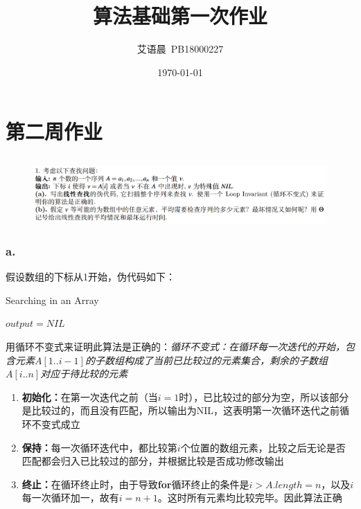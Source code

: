 \documentclass[]{report}
\title{{\huge {算法基础第一次作业}}}
\author{艾语晨~PB18000227}
\date{\today}
\begin{document}
\theoremstyle{definition} \newtheorem{theorem}{Thm}[section] %
\theoremstyle{definition} \newtheorem{definition}{Def}[section] %
\theoremstyle{plain} \newtheorem{lemma}{lemma}[section] %

	\maketitle
	\newpage

	\tableofcontents
	\newpage

  \chapter{第二周作业}
    \section{}%
    \begin{figure}[h!]
        \centering
        \includegraphics[scale=0.3]{images/Pro_1.png}
    \end{figure}
    \subsection{a.}
      假设数组的下标从1开始，伪代码如下：
      \begin{algorithm}
          \caption{Searching in an Array}
          $output=NIL$\\
      \end{algorithm}\par
      用循环不变式来证明此算法是正确的：\textit{循环不变式：在循环每一次迭代的开始，包含元素}$A[1..i-1]$\textit{的子数组构成了当前已比较过的元素集合，剩余的子数组}$A[i..n]$\textit{对应于待比较的元素}
      \begin{enumerate}
        \item \textbf{初始化：}在第一次迭代之前（当$i=1$时），已比较过的部分为空，所以该部分是比较过的，而且没有匹配，所以输出为NIL，这表明第一次循环迭代之前循环不变式成立
        \item \textbf{保持：}每一次循环迭代中，都比较第$i$个位置的数组元素，比较之后无论是否匹配都会归入已比较过的部分，并根据比较是否成功修改输出
        \item \textbf{终止：}在循环终止时，由于导致\textbf{for}循环终止的条件是$i>A.length=n$，以及$i$每一次循环加一，故有$i=n+1$。这时所有元素均比较完毕。因此算法正确
      \end{enumerate}\par
\end{document}
